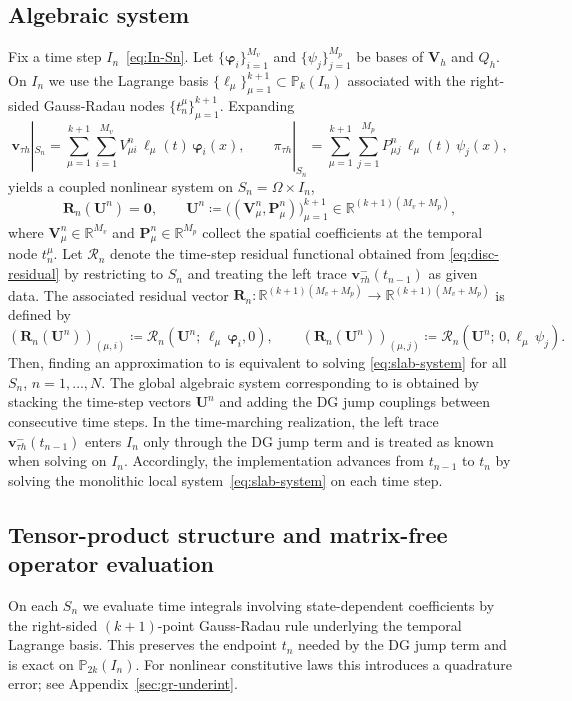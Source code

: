 \documentclass[DIV=16]{scrartcl}
\newcommand{\uu}{\boldsymbol v}
\newcommand{\In}{I_n}
\newcommand{\Sn}{S_n}
\newcommand{\Pk}{\mathbb P_k}
\newcommand{\Vh}{\boldsymbol V_h}
\begin{document}
\subsection{Algebraic system}
Fix a time step $\In$~\eqref{eq:In-Sn}.
Let $\{\boldsymbol\varphi_i\}_{i=1}^{M_v}$ and $\{\psi_j\}_{j=1}^{M_p}$ be
bases of $\Vh$ and $Q_h$.
On $\In$ we use the Lagrange basis
$\{\ell_\mu\}_{\mu=1}^{k+1}\subset\Pk(\In)$ associated with the right-sided
Gauss-Radau nodes $\{t_n^\mu\}_{\mu=1}^{k+1}$.
Expanding
\[
  \uu_{\tau h}|_{\Sn} = \sum_{\mu=1}^{k+1} \sum_{i=1}^{M_v} V_{\mu i}^n\,\ell_\mu(t)\,\boldsymbol\varphi_i(x),
  \qquad
  \pi_{\tau h}|_{\Sn} = \sum_{\mu=1}^{k+1} \sum_{j=1}^{M_p} P_{\mu j}^n\,\ell_\mu(t)\,\psi_j(x),
\]
yields a coupled nonlinear system on $\Sn=\Omega\times I_n$,
\begin{equation}\label{eq:slab-system}
  \bm R_n(\bm U^n) = \bm 0,
  \qquad
  \bm U^n \coloneq \bigl((\bm V_\mu^n,\bm P_\mu^n)\bigr)_{\mu=1}^{k+1}\in\mathbb R^{(k+1)(M_v+M_p)},
\end{equation}
where $\bm V_\mu^n\in\mathbb R^{M_v}$ and $\bm P_\mu^n\in\mathbb R^{M_p}$
collect the spatial coefficients at the temporal node $t_n^\mu$.
Let $\mathcal R_n$ denote the time-step residual functional obtained from
\eqref{eq:disc-residual} by restricting to $\Sn$ and treating the left trace
$\uu_{\tau h}^-(t_{n-1})$ as given data.
The associated residual vector
$\bm R_n:\mathbb R^{(k+1)(M_v+M_p)}\to\mathbb R^{(k+1)(M_v+M_p)}$ is defined by
\[
  (\bm R_n(\bm U^n))_{(\mu,i)} \coloneq
  \mathcal R_n \left(\bm U^n;\,\ell_\mu\,\boldsymbol\varphi_i,0\right),
  \qquad
  (\bm R_n(\bm U^n))_{(\mu,j)} \coloneq
  \mathcal R_n \left(\bm U^n;\,0,\ell_\mu\,\psi_j\right).
\]
Then, finding an approximation to  is equivalent to solving
\eqref{eq:slab-system} for all $\Sn$, $n=1,\dots,N$. The global algebraic system
corresponding to  is obtained by stacking the time-step
vectors $\bm U^n$ and adding the DG jump couplings between consecutive time
steps. In the time-marching realization, the left trace
$\uu_{\tau h}^-(t_{n-1})$ enters $\In$ only through the DG jump term and is
treated as known when solving on $\In$. Accordingly, the implementation advances
from $t_{n-1}$ to $t_n$ by solving the monolithic local
system~\eqref{eq:slab-system} on each time step.

\subsection{Tensor-product structure and matrix-free operator evaluation}
On each $\Sn$ we evaluate time integrals involving state-dependent coefficients
by the right-sided $(k{+}1)$-point Gauss-Radau rule underlying the temporal
Lagrange basis.
This preserves the endpoint $t_n$ needed by the DG jump term and is exact on
$\mathbb P_{2k}(\In)$.
For nonlinear constitutive laws this introduces a quadrature error; see
Appendix~\ref{sec:gr-underint}.
\end{document}
